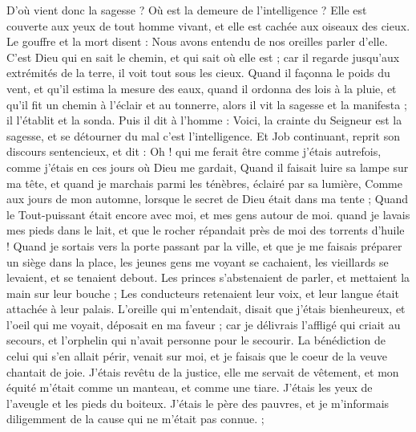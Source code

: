 \begin{multicols}{2}
D'où vient donc la sagesse ? Où est la demeure de l'intelligence ?
Elle est couverte aux yeux de tout homme vivant, et elle est cachée aux oiseaux des cieux.
Le gouffre et la mort disent : Nous avons entendu de nos oreilles parler d'elle.
C'est Dieu qui en sait le chemin, et qui sait où elle est ;
car il regarde jusqu'aux extrémités de la terre, il voit tout sous les cieux.
Quand il façonna le poids du vent, et qu'il estima la mesure des eaux,
quand il ordonna des lois à la pluie, et qu'il fit un chemin à l'éclair et au tonnerre,
alors il vit la sagesse et la manifesta ; il l'établit et la sonda.
Puis il dit à l'homme : Voici, la crainte du Seigneur est la sagesse, et se détourner du mal c'est l'intelligence.
\VerseOne{} Et Job continuant, reprit son discours sentencieux, et dit :
Oh ! qui me ferait être comme j'étais autrefois, comme j'étais en ces jours où Dieu me gardait,
Quand il faisait luire sa lampe sur ma tête, et quand je marchais parmi les ténèbres, éclairé par sa lumière,
 Comme aux jours de mon automne, lorsque le secret de Dieu était dans ma tente ;
Quand le Tout-puissant était encore avec moi, et mes gens autour de moi.
quand je lavais mes pieds dans le lait, et que le rocher répandait près de moi des torrents d'huile !
Quand je sortais vers la porte passant par la ville, et que je me faisais préparer un siège dans la place,
les jeunes gens me voyant se cachaient, les vieillards se levaient, et se tenaient debout.
Les princes s'abstenaient de parler, et mettaient la main sur leur bouche ;
Les conducteurs retenaient leur voix, et leur langue était attachée à leur palais.
L'oreille qui m'entendait, disait que j'étais bienheureux, et l'oeil qui me voyait, déposait en ma faveur ;
car je délivrais l'affligé qui criait au secours, et l'orphelin qui n'avait personne pour le secourir.
La bénédiction de celui qui s'en allait périr, venait sur moi, et je faisais que le coeur de la veuve chantait de joie.
J'étais revêtu de la justice, elle me servait de vêtement, et mon équité m'était comme un manteau, et comme une tiare.
J'étais les yeux de l'aveugle et les pieds du boiteux.
J'étais le père des pauvres, et je m'informais diligemment de la cause qui ne m'était pas connue. ;

\end{multicols}
